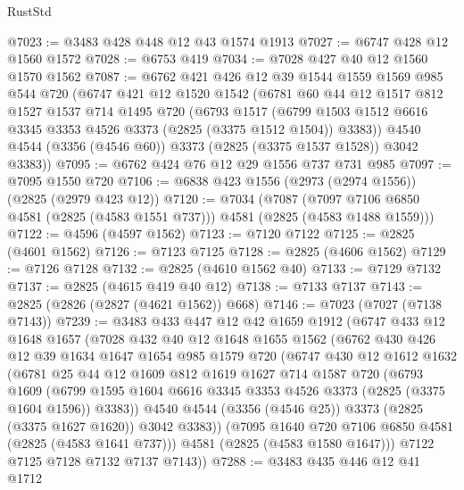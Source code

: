 \begin{lexlean}{RustStd}
\begin{coremodule}
@7023 := @3483 @428 @448 @12 @43 @1574 @1913
@7027 := @6747 @428 @12 @1560 @1572
@7028 := @6753 @419
@7034 := @7028 @427 @40 @12 @1560 @1570 @1562
@7087 := @6762
    @421
    @426
    @12
    @39
    @1544
    @1559
    @1569
    @985
    @544
    @720
    (@6747
      @421
      @12
      @1520
      @1542
      (@6781
        @60
        @44
        @12
        @1517
        @812
        @1527
        @1537
        @714
        @1495
        @720
        (@6793
          @1517
          (@6799 @1503 @1512 @6616 @3345 @3353 @4526 @3373 (@2825 (@3375 @1512 @1504)) @3383))
        @4540
        @4544
        (@3356 (@4546 @60))
        @3373
        (@2825 (@3375 @1537 @1528))
        @3042
        @3383))
@7095 := @6762 @424 @76 @12 @29 @1556 @737 @731 @985
@7097 := @7095 @1550 @720
@7106 := @6838 @423 @1556 (@2973 (@2974 @1556)) (@2825 (@2979 @423 @12))
@7120 := @7034
    (@7087 (@7097 @7106 @6850 @4581 (@2825 (@4583 @1551 @737))) @4581 (@2825 (@4583 @1488 @1559)))
@7122 := @4596 (@4597 @1562)
@7123 := @7120 @7122
@7125 := @2825 (@4601 @1562)
@7126 := @7123 @7125
@7128 := @2825 (@4606 @1562)
@7129 := @7126 @7128
@7132 := @2825 (@4610 @1562 @40)
@7133 := @7129 @7132
@7137 := @2825 (@4615 @419 @40 @12)
@7138 := @7133 @7137
@7143 := @2825 (@2826 (@2827 (@4621 @1562)) @668)
@7146 := @7023 (@7027 (@7138 @7143))
@7239 := @3483
    @433
    @447
    @12
    @42
    @1659
    @1912
    (@6747
      @433
      @12
      @1648
      @1657
      (@7028
        @432
        @40
        @12
        @1648
        @1655
        @1562
        (@6762
          @430
          @426
          @12
          @39
          @1634
          @1647
          @1654
          @985
          @1579
          @720
          (@6747
            @430
            @12
            @1612
            @1632
            (@6781
              @25
              @44
              @12
              @1609
              @812
              @1619
              @1627
              @714
              @1587
              @720
              (@6793
                @1609
                (@6799 @1595 @1604 @6616 @3345 @3353 @4526 @3373 (@2825 (@3375 @1604 @1596)) @3383))
              @4540
              @4544
              (@3356 (@4546 @25))
              @3373
              (@2825 (@3375 @1627 @1620))
              @3042
              @3383))
          (@7095 @1640 @720 @7106 @6850 @4581 (@2825 (@4583 @1641 @737)))
          @4581
          (@2825 (@4583 @1580 @1647)))
        @7122
        @7125
        @7128
        @7132
        @7137
        @7143))
@7288 := @3483
    @435
    @446
    @12
    @41
    @1712

\end{coremodule}
\end{lexlean}
